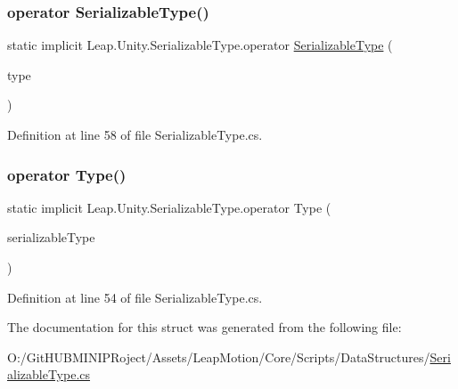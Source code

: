 \subsubsection{\texorpdfstring{operator SerializableType()}{operator SerializableType()}}
{\footnotesize\ttfamily static implicit Leap.\+Unity.\+Serializable\+Type.\+operator \mbox{\hyperlink{struct_leap_1_1_unity_1_1_serializable_type}{Serializable\+Type}} (\begin{DoxyParamCaption}\item[{Type}]{type }\end{DoxyParamCaption})\hspace{0.3cm}{\ttfamily [static]}}



Definition at line 58 of file Serializable\+Type.\+cs.

\mbox{\label{struct_leap_1_1_unity_1_1_serializable_type_a157197c60fdfac0d01be0aea49da81c6}} 
\subsubsection{\texorpdfstring{operator Type()}{operator Type()}}
{\footnotesize\ttfamily static implicit Leap.\+Unity.\+Serializable\+Type.\+operator Type (\begin{DoxyParamCaption}\item[{\mbox{\hyperlink{struct_leap_1_1_unity_1_1_serializable_type}{Serializable\+Type}}}]{serializable\+Type }\end{DoxyParamCaption})\hspace{0.3cm}{\ttfamily [static]}}



Definition at line 54 of file Serializable\+Type.\+cs.



The documentation for this struct was generated from the following file\+:\begin{DoxyCompactItemize}
\item 
O\+:/\+Git\+H\+U\+B\+M\+I\+N\+I\+P\+Roject/\+Assets/\+Leap\+Motion/\+Core/\+Scripts/\+Data\+Structures/\mbox{\hyperlink{_serializable_type_8cs}{Serializable\+Type.\+cs}}\end{DoxyCompactItemize}
